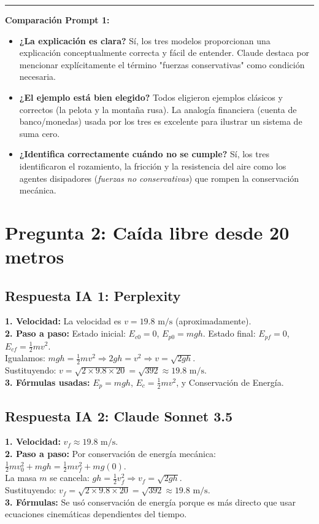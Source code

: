 \documentclass[11pt]{article}
\begin{document}
\vspace{0.5cm}
\hrule
\vspace{0.3cm}
\textbf{Comparación Prompt 1:}
\begin{itemize}
	\item \textbf{¿La explicación es clara?} Sí, los tres modelos proporcionan una explicación conceptualmente correcta y fácil de entender. Claude destaca por mencionar explícitamente el término "fuerzas conservativas" como condición necesaria.
	\item \textbf{¿El ejemplo está bien elegido?} Todos eligieron ejemplos clásicos y correctos (la pelota y la montaña rusa). La analogía financiera (cuenta de banco/monedas) usada por los tres es excelente para ilustrar un sistema de suma cero.
	\item \textbf{¿Identifica correctamente cuándo no se cumple?} Sí, los tres identificaron el rozamiento, la fricción y la resistencia del aire como los agentes disipadores (\textit{fuerzas no conservativas}) que rompen la conservación mecánica.
\end{itemize}

\newpage
\section*{Pregunta 2: Caída libre desde 20 metros}

\subsection*{Respuesta IA 1: Perplexity}
\textbf{1. Velocidad:} La velocidad es $v = 19.8 \text{ m/s}$ (aproximadamente). \\
\textbf{2. Paso a paso:}
Estado inicial: $E_{c0} = 0$, $E_{p0} = mgh$. Estado final: $E_{pf} = 0$, $E_{cf} = \frac{1}{2}mv^2$. \\
Igualamos: $mgh = \frac{1}{2}mv^2 \Rightarrow 2gh = v^2 \Rightarrow v = \sqrt{2gh}$. \\
Sustituyendo: $v = \sqrt{2 \times 9.8 \times 20} = \sqrt{392} \approx 19.8 \text{ m/s}$. \\
\textbf{3. Fórmulas usadas:} $E_p = mgh$, $E_c = \frac{1}{2}mv^2$, y Conservación de Energía.

\subsection*{Respuesta IA 2: Claude Sonnet 3.5}
\textbf{1. Velocidad:} $v_f \approx 19.8 \text{ m/s}$. \\
\textbf{2. Paso a paso:}
Por conservación de energía mecánica: $\frac{1}{2}mv_0^2 + mgh = \frac{1}{2}mv_f^2 + mg(0)$. \\
La masa $m$ se cancela: $gh = \frac{1}{2}v_f^2 \Rightarrow v_f = \sqrt{2gh}$. \\
Sustituyendo: $v_f = \sqrt{2 \times 9.8 \times 20} = \sqrt{392} \approx 19.8 \text{ m/s}$. \\
\textbf{3. Fórmulas:} Se usó conservación de energía porque es más directo que usar ecuaciones cinemáticas dependientes del tiempo.
\end{document}
